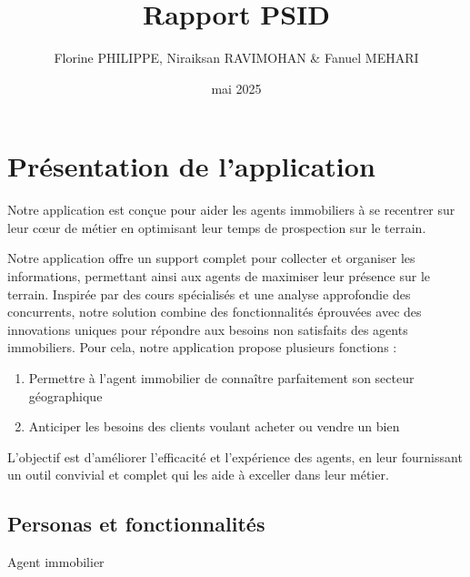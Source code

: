 \documentclass[a4paper, 12pt, twoside]{report}
\author{Florine PHILIPPE, Niraiksan RAVIMOHAN \& Fanuel MEHARI}
\title{Rapport PSID}
\date{mai 2025}
\begin{document}
\pagedegarde

\tableofcontents

\chapter{Présentation de l'application}

Notre application est conçue pour aider les agents immobiliers à se recentrer sur leur cœur de métier en optimisant leur temps de prospection sur le terrain. 

Notre application offre un support complet pour collecter et organiser les informations, permettant ainsi aux agents de maximiser leur présence sur le terrain. Inspirée par des cours spécialisés et une analyse approfondie des concurrents, notre solution combine des fonctionnalités éprouvées avec des innovations uniques pour répondre aux besoins non satisfaits des agents immobiliers. Pour cela, notre application propose plusieurs fonctions :

\begin{enumerate}
            \item Permettre à l’agent immobilier de connaître parfaitement son secteur géographique
            \item Anticiper les besoins des clients voulant acheter ou vendre un bien \\
\end{enumerate}

L'objectif est d'améliorer l'efficacité et l'expérience des agents, en leur fournissant un outil convivial et complet qui les aide à exceller dans leur métier.

\section{Personas et fonctionnalités}

Agent immobilier
\end{document}
